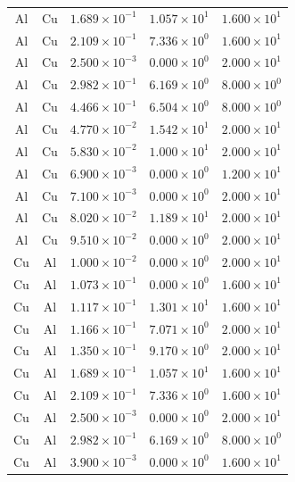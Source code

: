 \documentclass{article}
\begin{document}
\begin{longtable}{ccccc}
Al &  Cu & $1.689 \times 10^{-1}$ & $1.057 \times 10^{1}$ & $1.600 \times 10^{1}$ \\
Al &  Cu & $2.109 \times 10^{-1}$ & $7.336 \times 10^{0}$ & $1.600 \times 10^{1}$ \\
Al &  Cu & $2.500 \times 10^{-3}$ & $0.000 \times 10^{0}$ & $2.000 \times 10^{1}$ \\
Al &  Cu & $2.982 \times 10^{-1}$ & $6.169 \times 10^{0}$ & $8.000 \times 10^{0}$ \\
Al &  Cu & $4.466 \times 10^{-1}$ & $6.504 \times 10^{0}$ & $8.000 \times 10^{0}$ \\
Al &  Cu & $4.770 \times 10^{-2}$ & $1.542 \times 10^{1}$ & $2.000 \times 10^{1}$ \\
Al &  Cu & $5.830 \times 10^{-2}$ & $1.000 \times 10^{1}$ & $2.000 \times 10^{1}$ \\
Al &  Cu & $6.900 \times 10^{-3}$ & $0.000 \times 10^{0}$ & $1.200 \times 10^{1}$ \\
Al &  Cu & $7.100 \times 10^{-3}$ & $0.000 \times 10^{0}$ & $2.000 \times 10^{1}$ \\
Al &  Cu & $8.020 \times 10^{-2}$ & $1.189 \times 10^{1}$ & $2.000 \times 10^{1}$ \\
Al &  Cu & $9.510 \times 10^{-2}$ & $0.000 \times 10^{0}$ & $2.000 \times 10^{1}$ \\
Cu &  Al & $1.000 \times 10^{-2}$ & $0.000 \times 10^{0}$ & $2.000 \times 10^{1}$ \\
Cu &  Al & $1.073 \times 10^{-1}$ & $0.000 \times 10^{0}$ & $1.600 \times 10^{1}$ \\
Cu &  Al & $1.117 \times 10^{-1}$ & $1.301 \times 10^{1}$ & $1.600 \times 10^{1}$ \\
Cu &  Al & $1.166 \times 10^{-1}$ & $7.071 \times 10^{0}$ & $2.000 \times 10^{1}$ \\
Cu &  Al & $1.350 \times 10^{-1}$ & $9.170 \times 10^{0}$ & $2.000 \times 10^{1}$ \\
Cu &  Al & $1.689 \times 10^{-1}$ & $1.057 \times 10^{1}$ & $1.600 \times 10^{1}$ \\
Cu &  Al & $2.109 \times 10^{-1}$ & $7.336 \times 10^{0}$ & $1.600 \times 10^{1}$ \\
Cu &  Al & $2.500 \times 10^{-3}$ & $0.000 \times 10^{0}$ & $2.000 \times 10^{1}$ \\
Cu &  Al & $2.982 \times 10^{-1}$ & $6.169 \times 10^{0}$ & $8.000 \times 10^{0}$ \\
Cu &  Al & $3.900 \times 10^{-3}$ & $0.000 \times 10^{0}$ & $1.600 \times 10^{1}$ \\

\end{longtable}
\end{document}
